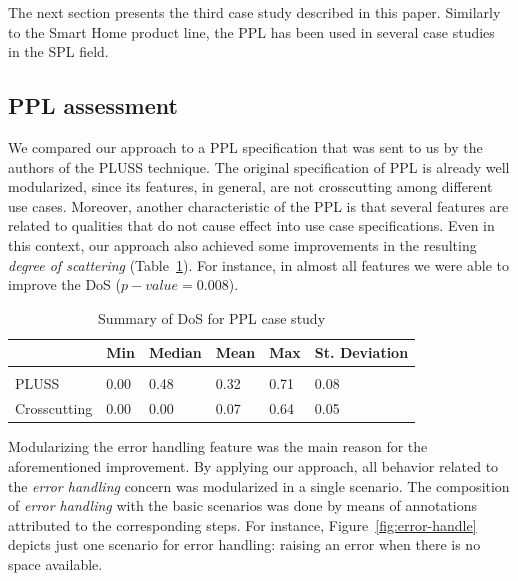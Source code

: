 \documentclass{acm_proc_article-sp}
\begin{document}
The next section presents the third case study described in this paper.
Similarly to the Smart Home product line, the PPL has been used in several case
studies~\cite{Conejero:2008aa,Morin:2008aa} in the SPL field.

\subsection{PPL assessment}

We compared our approach to a PPL specification that was sent to us by the
authors of the PLUSS technique. The original specification of PPL is already well
modularized, since its features, in general, are not crosscutting among different
use cases. Moreover, another characteristic of the PPL is that several features
are related to qualities that do not cause effect into use case specifications.
Even in this context, our approach also achieved some improvements in the
resulting \emph{degree of scattering} (Table~\ref{tab:ppl-dos}). For instance, 
in almost all features we were able to improve the DoS ($p-value=0.008$). 


\begin{table}[htb] \centering
\caption{Summary of DoS for PPL case study}
\label{tab:ppl-dos}
\begin{small}
\begin{tabular}{llllll} \hline
					& Min 	& Median 	& Mean 	& Max 	& St. Deviation \\ \hline \\
	PLUSS			& 0.00	& 0.48		& 0.32	& 0.71	& 0.08			\\
	Crosscutting	& 0.00  & 0.00   	& 0.07 	& 0.64 	& 0.05			\\ \hline	
\end{tabular}
\end{small}
\end{table}


Modularizing the error handling feature was the main reason for the
aforementioned improvement. By applying our approach, all behavior related to
the \emph{error handling} concern was modularized in a single scenario. The
composition of \emph{error handling} with the basic scenarios was done by means
of annotations attributed to the corresponding steps. For instance,
Figure~\ref{fig:error-handle} depicts just one scenario for error handling:
raising  an error when there is no space available.
\end{document}
